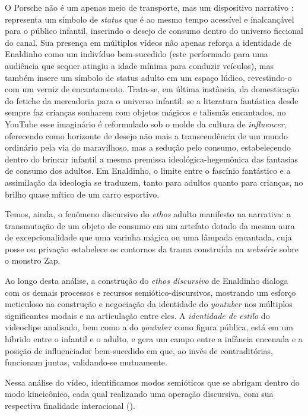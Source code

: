 \documentclass[portuguese]{textolivre}
\begin{document}
O Porsche não é um apenas meio de transporte, mas um dispositivo narrativo \cite[p. 19]{Gulino2004Screenwriting}: representa um símbolo de \textit{status} que é ao mesmo tempo acessível e inalcançável para o público infantil, inserindo o desejo de consumo dentro do universo ficcional do canal. Sua presença em múltiplos vídeos não apenas reforça a identidade de Enaldinho como um indivíduo bem-sucedido (este performado para uma audiência que sequer atingiu a idade mínima para conduzir veículos), mas também insere um símbolo de status adulto em um espaço lúdico, revestindo-o com um verniz de encantamento. Trata-se, em última instância, da domesticação do fetiche da mercadoria para o universo infantil: se a literatura fantástica desde sempre faz crianças sonharem com objetos mágicos e talismãs encantados, no YouTube esse imaginário é reformulado sob o molde da cultura de \textit{influencer}, oferecendo como horizonte de desejo não mais a transcendência de um mundo ordinário pela via do maravilhoso, mas a sedução pelo consumo, estabelecendo dentro do brincar infantil a mesma premissa ideológica-hegemônica das fantasias de consumo dos adultos. Em Enaldinho, o limite entre o fascínio fantástico e a assimilação da ideologia se traduzem, tanto para adultos quanto para crianças, no brilho quase mítico de um carro esportivo.

Temos, ainda, o fenômeno discursivo do \textit{ethos} adulto manifesto na narrativa: a transmutação de um objeto de consumo em um artefato dotado da mesma aura de excepcionalidade que uma varinha mágica ou uma lâmpada encantada, cuja posse ou privação estabelece os contornos da trama construída na \textit{websérie} sobre o monstro Zap.

Ao longo desta análise, a construção do \textit{ethos discursivo} de Enaldinho dialoga com os demais processos e recursos semiótico-discursivos, mostrando um esforço meticuloso na construção e negociação da identidade do \textit{youtuber} nos múltiplos significantes modais e na articulação entre eles. A \textit{identidade de estilo} do videoclipe analisado, bem como a do \textit{youtuber} como figura pública, está em um híbrido entre o infantil e o adulto, e gera um campo entre a infância encenada e a posição de influenciador bem-sucedido em que, ao invés de contraditórias, funcionam juntas, validando-se mutuamente.

Nessa análise do vídeo, identificamos modos semióticos que se abrigam dentro do modo kineicônico, cada qual realizando uma operação discursiva, com sua respectiva finalidade interacional ().
\end{document}

